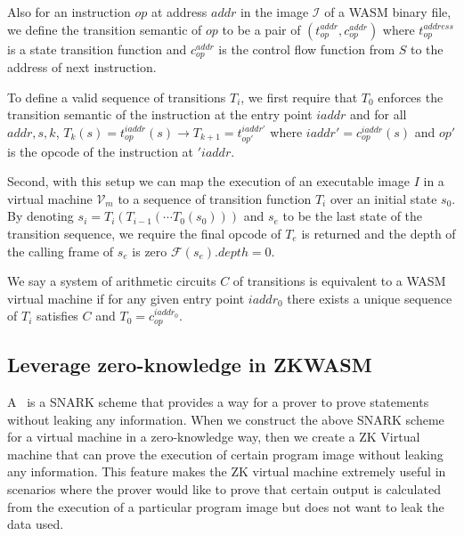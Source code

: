 Also for an instruction $op$ at address $addr$ in the image $\mathcal{I}$ of a WASM binary file, we define the transition semantic of $op$ to be a pair of $(t^{addr}_{op}, c^{addr}_{op})$ where $t^{address}_{op}$ is a state transition function and $c^{addr}_{op}$ is the control flow function from $S$ to the address of next instruction.

To define a valid sequence of transitions $T_i$, we first require that $T_0$ enforces the transition semantic of the instruction at the entry point $iaddr$ and for all $addr, s, k$, $T_k(s) = t^{iaddr}_{op}(s) \rightarrow T_{k+1} = t_{op'}^{iaddr'}$ where $iaddr' = c_{op}^{iaddr}(s)$ and $op'$ is the opcode of the instruction at $'iaddr$.

Second, with this setup we can map the execution of an executable image $I$ in a virtual machine $\mathcal{V}_m$ to a sequence of transition function $T_i$ over an initial state $s_0$. By denoting $s_i = T_i (T_{i-1}(\cdots T_0(s_0)))$ and $s_e$ to be the last state of the transition sequence, we require the final opcode of $T_{e}$ is returned and the depth of the calling frame of $s_e$ is zero $\mathcal{F}(s_e).depth = 0$.

We say a system of arithmetic circuits $C$ of transitions is equivalent to a WASM virtual machine if for any given entry point $iaddr_0$ there exists a unique sequence of $T_i$ satisfies $C$ and $T_0 = c^{iaddr_0}_{op}$.

\subsection{Leverage zero-knowledge in ZKWASM}
A \zksnark\, is a SNARK scheme that provides a way for a prover to prove statements without leaking any information. When we construct the above SNARK scheme for a virtual machine in a zero-knowledge way, then we create a ZK Virtual machine that can prove the execution of certain program image without leaking any information.  This feature makes the ZK virtual machine extremely useful in scenarios where the prover would like to prove that certain output is calculated from the execution of a particular program image but does not want to leak the data used.
 

